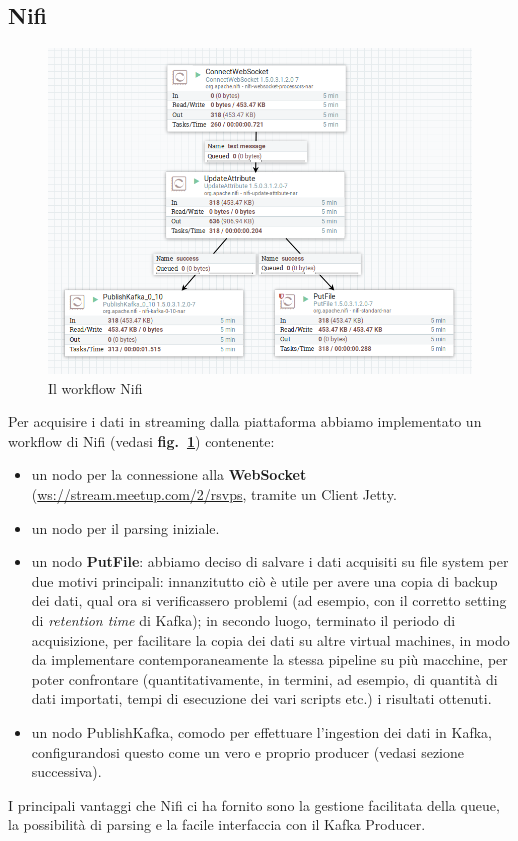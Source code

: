 \documentclass[fleqn,10pt]{SelfArx} %
\begin{document}
{\subsection{Nifi}%
\begin{figure}
\includegraphics[scale=0.3]{images/nifi_workflow.png}
\caption{\label{nifi_workflow} Il workflow Nifi}
\end{figure}
Per acquisire i dati in streaming dalla piattaforma abbiamo implementato un workflow di Nifi (vedasi \textbf{fig.~\ref{nifi_workflow}}) contenente: 
\begin{itemize} %
\item un nodo per la connessione alla \textbf{WebSocket} (\url{ws://stream.meetup.com/2/rsvps}, tramite un Client Jetty. 
\item un nodo per il parsing iniziale.
\item un nodo \textbf{PutFile}: abbiamo deciso di salvare i dati acquisiti su file system per due motivi principali: innanzitutto ciò è utile per avere una copia di backup dei dati, qual ora si verificassero problemi (ad esempio, con il corretto setting di \textit{retention time} di Kafka); in secondo luogo, terminato il periodo di acquisizione, per facilitare la copia dei dati su altre virtual machines, in modo da implementare contemporaneamente la stessa pipeline su più macchine, per poter confrontare (quantitativamente, in termini, ad esempio, di quantità di dati importati, tempi di esecuzione dei vari scripts etc.) i risultati ottenuti.
\item un nodo PublishKafka, comodo per effettuare l'ingestion dei dati in Kafka, configurandosi questo come un vero e proprio producer (vedasi sezione successiva). %
\end{itemize} 
I principali vantaggi che Nifi ci ha fornito sono la gestione facilitata della queue, la possibilità di parsing e la facile interfaccia con il Kafka Producer.
}
\end{document}
